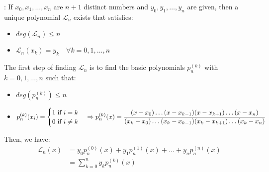       \par {}: If $x_0, x_1, \ldots, x_n$ are $n + 1$ distinct numbers
        and $y_0, y_1, \ldots, y_n$ are given, then a unique polynomial
        $\mathcal{L}_n$ exists that satisfies:
        \begin{itemize}
          \item $deg(\mathcal{L}_n) \leq n$
          \item $\mathcal{L}_n(x_k) = y_k \quad \forall k = 0, 1, \ldots, n$
        \end{itemize}
      \par The first step of finding $\mathcal{L}_n$ is to find the basic
        polynomials $p_n^{(k)}$ with $k = 0, 1, \ldots, n$ such that:
        \begin{itemize}
          \item $deg(p_n^{(k)}) \leq n$
          \item
            \begin{align*}
              p_n^{(k)}(x_i) =
              \begin{cases}
                1 \mbox{ if } i = k \\
                0 \mbox{ if } i \neq k
              \end{cases}
              \Rightarrow p_n^{(k)}(x)
                = \frac{(x - x_0) \ldots (x - x_{k - 1})(x - x_{k + 1}) \ldots (x - x_n)}
                       {(x_k - x_0) \ldots (x_k - x_{k - 1})(x_k - x_{k + 1}) \ldots (x_k - x_n)}
            \end{align*}
        \end{itemize}
      \par Then, we have:
        \begin{align*}
          \mathcal{L}_n(x) &= y_0 p_n^{(0)}(x)
                          + y_1 p_n^{(1)}(x) + \ldots
                          + y_n p_n^{(n)}(x) \\
                          &= \sum\limits_{k = 0}^n y_k p_n^{(k)} (x)
        \end{align*}


